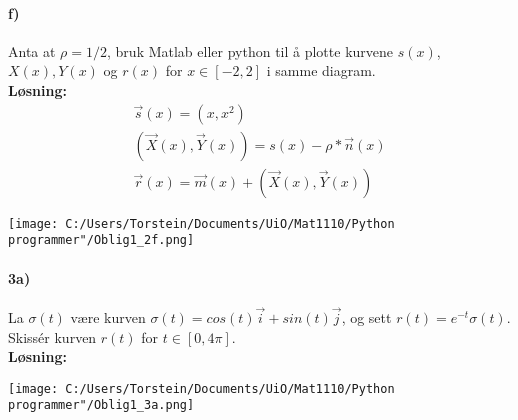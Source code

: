 \documentclass[11pt, A4paper,norsk]{article}
\begin{document}
		\paragraph{f)}
			\begin{flushleft}
Anta at $\rho = 1/2$, bruk Matlab eller python til å plotte kurvene $s(x)$, $X(x), Y(x)$ og $r(x)$ for $x \in [−2, 2]$ i samme diagram. \\
\vspace{1mm}
\textbf{Løsning:} \\
\vspace{1mm}
				\begin{align}
\vec{s}(x) = (x, x^2) \nonumber \\
(\vec{X}(x), \vec{Y}(x)) = s(x) - \rho*\vec{n}(x) \nonumber \\
\vec{r}(x) = \vec{m}(x) + (\vec{X}(x), \vec{Y}(x)) \nonumber
				\end{align}

\texttt{[image: C:/Users/Torstein/Documents/UiO/Mat1110/Python programmer"/Oblig1\_2f.png]}
				\end{flushleft}
		\paragraph{3a)}
			\begin{flushleft}
La $\sigma(t)$ være kurven $\sigma(t) = cos(t)\vec{i} + sin(t)\vec{j}$, og sett $r(t) = e^{- t}\sigma(t)$. \\
Skissér kurven $r(t)$ for $t \in [0, 4\pi]$. \\
\vspace{1mm}
\textbf{Løsning:} \\
\vspace{1mm}

\texttt{[image: C:/Users/Torstein/Documents/UiO/Mat1110/Python programmer"/Oblig1\_3a.png]}
			\end{flushleft}
\end{document}

